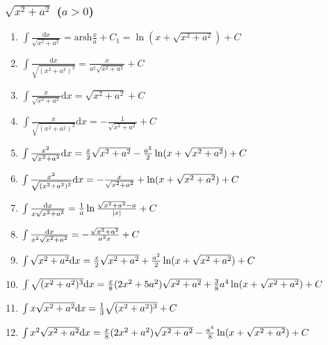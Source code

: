 \begin{tiny}
\begin{enumerate}[noitemsep]
\end{enumerate}

\subsubsection{$\sqrt{x^2+a^2}$ ($a>0$)}

\begin{enumerate}[noitemsep]

\item $ \int \frac{\mathrm{d}x}{\sqrt{x^2+a^2}} = \mathrm{arsh} \frac{x}{a} + C_1 = \ln(x + \sqrt{x^2+a^2}) + C$

\item $ \int \frac{\mathrm{d}x}{\sqrt{(x^2+a^2)^3}} = \frac{x}{a^2\sqrt{x^2+a^2}} + C $

\item $ \int \frac{x}{\sqrt{x^2+a^2}} \mathrm{d}x = \sqrt{x^2+a^2} + C $

\item $ \int \frac{x}{\sqrt{(x^2+a^2)^3}} \mathrm{d}x = -\frac{1}{\sqrt{x^2+a^2}} + C $

\item $ \int \frac{x^2}{\sqrt{x^2+a^2}} \mathrm{d} x = \frac{x}{2}\sqrt{x^2+a^2} - \frac{a^2}{2}\ln(x+\sqrt{x^2+a^2}) + C $

\item $ \int \frac{x^2}{\sqrt{(x^2+a^2)^3}} \mathrm{d} x = -\frac{x}{\sqrt{x^2+a^2}} + \ln(x+\sqrt{x^2+a^2}) + C $

\item $ \int \frac{\mathrm{d} x}{x\sqrt{x^2+a^2}} = \frac{1}{a} \ln \frac{\sqrt{x^2+a^2}-a}{|x|} + C $

\item $ \int \frac{\mathrm{d} x}{x^2\sqrt{x^2+a^2}} = -\frac{\sqrt{x^2+a^2}}{a^2x} + C $

\item $ \int \sqrt{x^2+a^2} \mathrm{d} x = \frac{x}{2}\sqrt{x^2+a^2}+\frac{a^2}{2}\ln(x + \sqrt{x^2+a^2}) + C $

\item $ \int \sqrt{(x^2+a^2)^3} \mathrm{d} x = \frac{x}{8}(2x^2+5a^2)\sqrt{x^2+a^2} + \frac{3}{8}a^4\ln(x + \sqrt{x^2+a^2}) + C $

\item $ \int x \sqrt{x^2+a^2} \mathrm{d} x = \frac{1}{3} \sqrt{(x^2+a^2)^3} + C $

\item $ \int x^2\sqrt{x^2+a^2} \mathrm{d} x = \frac{x}{8}(2x^2+a^2)\sqrt{x^2+a^2} - \frac{a^4}{8}\ln(x+\sqrt{x^2+a^2}) + C $


\end{enumerate}
\end{tiny}
